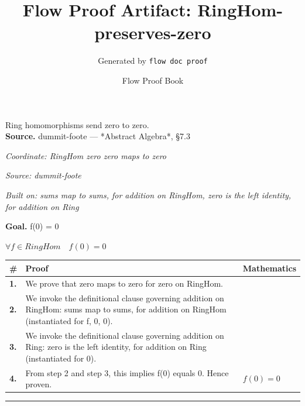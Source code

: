 \documentclass[11pt]{article}
\title{Flow Proof Artifact: RingHom-preserves-zero}
\author{Generated by \texttt{flow doc proof}}
\date{Flow Proof Book}
\theoremstyle{definition}
\begin{document}
\maketitle
Ring homomorphisms send zero to zero.\\[0.5em]
\textbf{Source.} dummit-foote — *Abstract Algebra*, §7.3\\[0.5em]
\bigskip
{}\par
\smallskip\noindent\textit{Coordinate: RingHom \cdot zero \cdot zero maps to zero}\par
\smallskip\noindent\textit{Source: dummit-foote}\par
\smallskip\noindent\textit{Built on: sums map to sums, for addition on RingHom, zero is the left identity, for addition on Ring}\par
\medskip
\noindent\textbf{Goal.} f(0) = 0\par
\noindent$\displaystyle \forall f \in RingHom\quad f(0) = 0$\par
\medskip
\noindent
\begin{tabular}{@{} >{\raggedright\arraybackslash}p{} >{\raggedright\arraybackslash}p{} >{\raggedleft\arraybackslash}p{} @{}}
\textbf{\#} & \textbf{Proof} & \textbf{Mathematics} \\
\midrule
\textbf{1.} & We prove that zero maps to zero for zero on RingHom. & \\[0.45em]
\textbf{2.} & We invoke the definitional clause governing addition on RingHom: sums map to sums, for addition on RingHom (instantiated for f, 0, 0). & \\[0.45em]
\textbf{3.} & We invoke the definitional clause governing addition on Ring: zero is the left identity, for addition on Ring (instantiated for 0). & \\[0.45em]
\textbf{4.} & From step 2 and step 3, this implies f(0) equals 0. Hence proven. & $\displaystyle f(0) = 0$ \\[0.45em]
\bottomrule
\end{tabular}
\label{thm:RingHom-zero-zero_maps_to_zero}
\par\medskip\hrule
\end{document}
